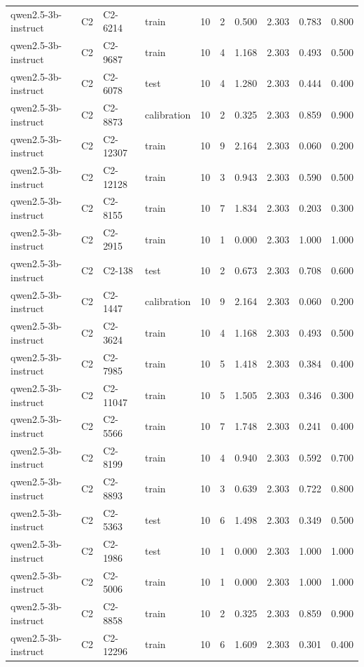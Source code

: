 \begin{table}
\begin{tabular}{llllrrrrrr}
qwen2.5-3b-instruct & C2 & C2-6214 & train & 10 & 2 & 0.500 & 2.303 & 0.783 & 0.800 \\
qwen2.5-3b-instruct & C2 & C2-9687 & train & 10 & 4 & 1.168 & 2.303 & 0.493 & 0.500 \\
qwen2.5-3b-instruct & C2 & C2-6078 & test & 10 & 4 & 1.280 & 2.303 & 0.444 & 0.400 \\
qwen2.5-3b-instruct & C2 & C2-8873 & calibration & 10 & 2 & 0.325 & 2.303 & 0.859 & 0.900 \\
qwen2.5-3b-instruct & C2 & C2-12307 & train & 10 & 9 & 2.164 & 2.303 & 0.060 & 0.200 \\
qwen2.5-3b-instruct & C2 & C2-12128 & train & 10 & 3 & 0.943 & 2.303 & 0.590 & 0.500 \\
qwen2.5-3b-instruct & C2 & C2-8155 & train & 10 & 7 & 1.834 & 2.303 & 0.203 & 0.300 \\
qwen2.5-3b-instruct & C2 & C2-2915 & train & 10 & 1 & 0.000 & 2.303 & 1.000 & 1.000 \\
qwen2.5-3b-instruct & C2 & C2-138 & test & 10 & 2 & 0.673 & 2.303 & 0.708 & 0.600 \\
qwen2.5-3b-instruct & C2 & C2-1447 & calibration & 10 & 9 & 2.164 & 2.303 & 0.060 & 0.200 \\
qwen2.5-3b-instruct & C2 & C2-3624 & train & 10 & 4 & 1.168 & 2.303 & 0.493 & 0.500 \\
qwen2.5-3b-instruct & C2 & C2-7985 & train & 10 & 5 & 1.418 & 2.303 & 0.384 & 0.400 \\
qwen2.5-3b-instruct & C2 & C2-11047 & train & 10 & 5 & 1.505 & 2.303 & 0.346 & 0.300 \\
qwen2.5-3b-instruct & C2 & C2-5566 & train & 10 & 7 & 1.748 & 2.303 & 0.241 & 0.400 \\
qwen2.5-3b-instruct & C2 & C2-8199 & train & 10 & 4 & 0.940 & 2.303 & 0.592 & 0.700 \\
qwen2.5-3b-instruct & C2 & C2-8893 & train & 10 & 3 & 0.639 & 2.303 & 0.722 & 0.800 \\
qwen2.5-3b-instruct & C2 & C2-5363 & test & 10 & 6 & 1.498 & 2.303 & 0.349 & 0.500 \\
qwen2.5-3b-instruct & C2 & C2-1986 & test & 10 & 1 & 0.000 & 2.303 & 1.000 & 1.000 \\
qwen2.5-3b-instruct & C2 & C2-5006 & train & 10 & 1 & 0.000 & 2.303 & 1.000 & 1.000 \\
qwen2.5-3b-instruct & C2 & C2-8858 & train & 10 & 2 & 0.325 & 2.303 & 0.859 & 0.900 \\
qwen2.5-3b-instruct & C2 & C2-12296 & train & 10 & 6 & 1.609 & 2.303 & 0.301 & 0.400 \\

\end{tabular}
\end{table}
